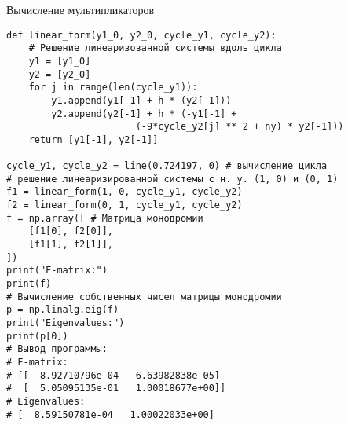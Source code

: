 \begin{program}
    \caption{Вычисление мультипликаторов}
    \label{lab4:prog:1}
    \begin{verbatim}
def linear_form(y1_0, y2_0, cycle_y1, cycle_y2):
    # Решение линеаризованной системы вдоль цикла
    y1 = [y1_0]
    y2 = [y2_0]
    for j in range(len(cycle_y1)):
        y1.append(y1[-1] + h * (y2[-1]))
        y2.append(y2[-1] + h * (-y1[-1] +
                       (-9*cycle_y2[j] ** 2 + ny) * y2[-1]))
    return [y1[-1], y2[-1]]

cycle_y1, cycle_y2 = line(0.724197, 0) # вычисление цикла
# решение линеаризированной системы с н. у. (1, 0) и (0, 1)
f1 = linear_form(1, 0, cycle_y1, cycle_y2)
f2 = linear_form(0, 1, cycle_y1, cycle_y2)
f = np.array([ # Матрица монодромии
    [f1[0], f2[0]],
    [f1[1], f2[1]],
])
print("F-matrix:")
print(f)
# Вычисление собственных чисел матрицы монодромии
p = np.linalg.eig(f)
print("Eigenvalues:")
print(p[0])
# Вывод программы:
# F-matrix:
# [[  8.92710796e-04   6.63982838e-05]
#  [  5.05095135e-01   1.00018677e+00]]
# Eigenvalues:
# [  8.59150781e-04   1.00022033e+00]
    \end{verbatim}
\end{program}